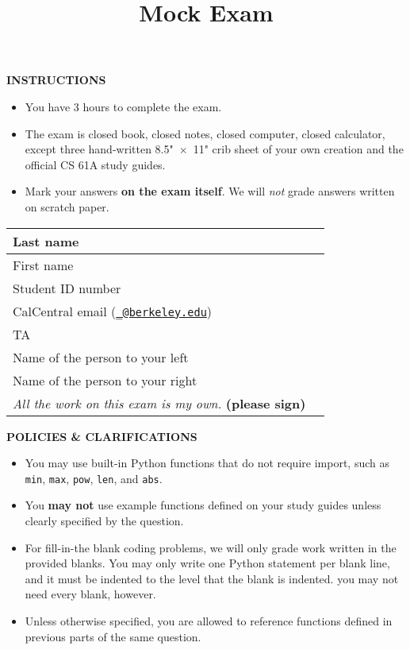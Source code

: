 \documentclass[twoside]{article}
\title{\sc Mock Exam \solution{}}
\begin{document}
\thispagestyle{empty}
\maketitle

\medskip

\textbf{INSTRUCTIONS}

\begin{itemize}
\item You have 3 hours to complete the exam.

\item The exam is closed book, closed notes, closed computer, closed calculator,
except three hand-written 8.5"~$\times$~11" crib sheet of your own creation and
the official CS 61A study guides.

\item Mark your answers \textbf{on the exam itself}. We will \emph{not} grade
answers written on scratch paper.
\end{itemize}

\medskip

\begin{center}
\begin{tabular}{|m{6cm}|m{8cm}|}
\hline
Last name & \\ [0.8cm]
\hline
First name & \\ [0.8cm]
\hline
Student ID number & \\ [0.8cm]
\hline
CalCentral email (\href{http://berkeley.edu}{\nolinkurl{\_@berkeley.edu}}) & \\ [0.8cm]
\hline
TA & \\ [0.8cm]
\hline
Name of the person to your left & \\ [0.8cm]
\hline
Name of the person to your right & \\ [0.8cm]
\hline
\emph{All the work on this exam is my own.} \textbf{(please sign)} & \\ [0.8cm]
\hline
\end{tabular}
\end{center}

\textbf{POLICIES \& CLARIFICATIONS}

\begin{itemize}

\item You may use built-in Python functions that do not require import, such as
\lstinline$min$, \lstinline$max$, \lstinline$pow$, \lstinline$len$, and
\lstinline$abs$.

\item You \textbf{may not} use example functions defined on your study guides
unless clearly specified by the question.

\item For fill-in-the blank coding problems, we will only grade work written in
the provided blanks. You may only write one Python statement per blank line, and
it must be indented to the level that the blank is indented. you may not need every 
blank, however.

\item Unless otherwise specified, you are allowed to reference functions
defined in previous parts of the same question.

\end{itemize}
\end{document}
